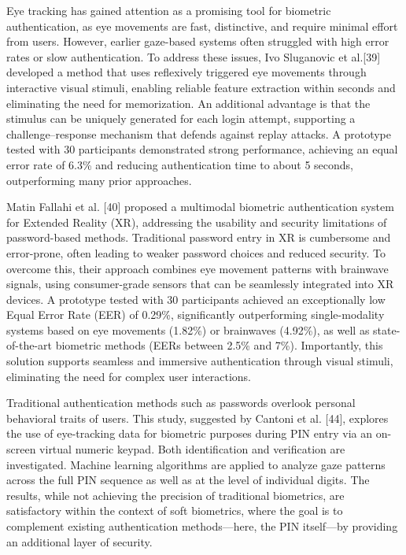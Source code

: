 \documentclass{article}
\begin{document}
Eye tracking has gained attention as a promising tool for biometric authentication, as eye movements are fast, distinctive, and require minimal effort from users.
However, earlier gaze-based systems often struggled with high error rates or slow authentication.
To address these issues, Ivo Sluganovic et al.[39] developed a method that uses reflexively triggered eye movements through interactive visual stimuli, enabling reliable feature extraction within seconds and eliminating the need for memorization. 
An additional advantage is that the stimulus can be uniquely generated for each login attempt, supporting a challenge–response mechanism that defends against replay attacks. 
A prototype tested with 30 participants demonstrated strong performance, achieving an equal error rate of 6.3\% and reducing authentication time to about 5 seconds, outperforming many prior approaches.

Matin Fallahi et al. [40] proposed a multimodal biometric authentication system for Extended Reality (XR), addressing the usability and security limitations of password-based methods. 
Traditional password entry in XR is cumbersome and error-prone, often leading to weaker password choices and reduced security. 
To overcome this, their approach combines eye movement patterns with brainwave signals, using consumer-grade sensors that can be seamlessly integrated into XR devices.
A prototype tested with 30 participants achieved an exceptionally low Equal Error Rate (EER) of 0.29\%, significantly outperforming single-modality systems based on eye movements (1.82\%) or brainwaves (4.92\%), as well as state-of-the-art biometric methods (EERs between 2.5\% and 7\%).
Importantly, this solution supports seamless and immersive authentication through visual stimuli, eliminating the need for complex user interactions.

Traditional authentication methods such as passwords overlook personal behavioral traits of users.
This study, suggested by Cantoni et al. [44], explores the use of eye-tracking data for biometric purposes during PIN entry via an on-screen virtual numeric keypad.
Both identification and verification are investigated. 
Machine learning algorithms are applied to analyze gaze patterns across the full PIN sequence as well as at the level of individual digits. 
The results, while not achieving the precision of traditional biometrics, are satisfactory within the context of soft biometrics, where the goal is to complement existing authentication methods—here, the PIN itself—by providing an additional layer of security.
\end{document}
